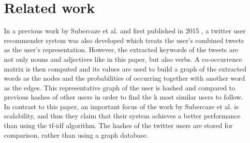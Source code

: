 \section{Related work}
\label{sec:relwork}

In a previous work by Subercaze et al. and first published in 2015
\citep{userRec}, a twitter user recommender system was also developed which
treats the user’s combined tweets as the user’s representation. However, the
extracted keywords of the tweets are not only nouns and adjectives like in this
paper, but also verbs. A co-occurrence matrix is then computed and its values
are used to build a graph of the extracted words as the nodes and the
probabilities of occurring together with another word as the edges. This
representative graph of the user is hashed and compared to previous hashes of
other users in order to find the k most similar users to follow. In contrast to
this paper, an important focus of the work by Subercaze et al. is scalability,
and thus they claim that their system achieves a better performance than using
the tf-idf algorithm. The hashes of the twitter users are stored for comparison,
rather than using a graph database.



